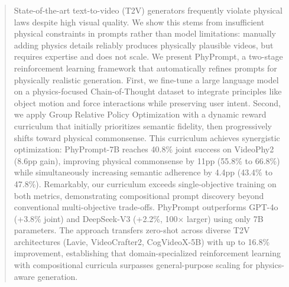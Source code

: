 \begin{abstract}
State-of-the-art text-to-video (T2V) generators frequently violate physical laws despite high visual quality. We show this stems from insufficient physical constraints in prompts rather than model limitations: manually adding physics details reliably produces physically plausible videos, but requires expertise and does not scale.
We present PhyPrompt, a two-stage reinforcement learning framework that automatically refines prompts for physically realistic generation. First, we fine-tune a large language model on a physics-focused Chain-of-Thought dataset to integrate principles like object motion and force interactions while preserving user intent. Second, we apply Group Relative Policy Optimization with a dynamic reward curriculum that initially prioritizes semantic fidelity, then progressively shifts toward physical commonsense. This curriculum achieves synergistic optimization: PhyPrompt-7B reaches 40.8\% joint success on VideoPhy2 (8.6pp gain), improving physical commonsense by 11pp (55.8\% to 66.8\%) while simultaneously increasing semantic adherence by 4.4pp (43.4\% to 47.8\%). Remarkably, our curriculum exceeds single-objective training on both metrics, demonstrating compositional prompt discovery beyond conventional multi-objective trade-offs.
PhyPrompt outperforms GPT-4o (+3.8\% joint) and DeepSeek-V3 (+2.2\%, 100$\times$ larger) using only 7B parameters. The approach transfers zero-shot across diverse T2V architectures (Lavie, VideoCrafter2, CogVideoX-5B) with up to 16.8\% improvement, establishing that domain-specialized reinforcement learning with compositional curricula surpasses general-purpose scaling for physics-aware generation.
\end{abstract}
